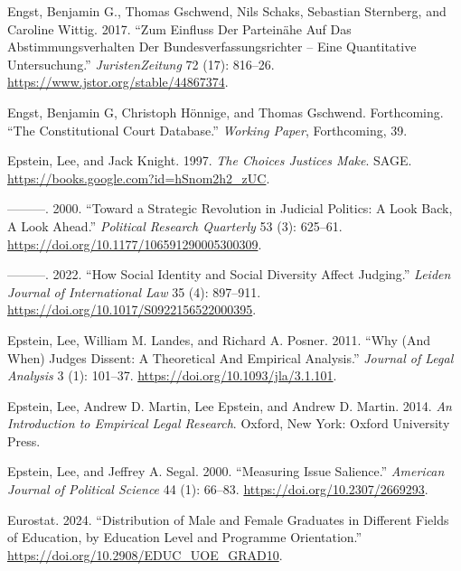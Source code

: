 \documentclass[
  11pt,
]{article}
\newlength{\cslhangindent}
\newenvironment{CSLReferences}[2] %
 {\begin{list}{}{%
  \setlength{\itemindent}{0pt}
  \setlength{\leftmargin}{0pt}
  \setlength{\parsep}{0pt}
  \ifodd #1
   \setlength{\leftmargin}{\cslhangindent}
   \setlength{\itemindent}{-1\cslhangindent}
  \fi
  \setlength{\itemsep}{#2\baselineskip}}}
 {\end{list}}
\begin{document}
\begin{CSLReferences}{1}{0}
Engst, Benjamin G., Thomas Gschwend, Nils Schaks, Sebastian Sternberg, and Caroline Wittig. 2017. {``Zum {Einfluss} Der {Parteinähe} Auf Das {Abstimmungsverhalten} Der {Bundesverfassungsrichter} -- Eine Quantitative {Untersuchung}.''} \emph{JuristenZeitung} 72 (17): 816--26. \url{https://www.jstor.org/stable/44867374}.

Engst, Benjamin G, Christoph Hönnige, and Thomas Gschwend. Forthcoming. {``The {Constitutional Court Database}.''} \emph{Working Paper}, Forthcoming, 39.

Epstein, Lee, and Jack Knight. 1997. \emph{The {Choices Justices Make}}. SAGE. \url{https://books.google.com?id=hSnom2h2_zUC}.

---------. 2000. {``Toward a {Strategic Revolution} in {Judicial Politics}: {A Look Back}, {A Look Ahead}.''} \emph{Political Research Quarterly} 53 (3): 625--61. \url{https://doi.org/10.1177/106591290005300309}.

---------. 2022. {``How Social Identity and Social Diversity Affect Judging.''} \emph{Leiden Journal of International Law} 35 (4): 897--911. \url{https://doi.org/10.1017/S0922156522000395}.

Epstein, Lee, William M. Landes, and Richard A. Posner. 2011. {``Why ({And When}) {Judges Dissent}: {A Theoretical And Empirical Analysis}.''} \emph{Journal of Legal Analysis} 3 (1): 101--37. \url{https://doi.org/10.1093/jla/3.1.101}.

Epstein, Lee, Andrew D. Martin, Lee Epstein, and Andrew D. Martin. 2014. \emph{An {Introduction} to {Empirical Legal Research}}. Oxford, New York: Oxford University Press.

Epstein, Lee, and Jeffrey A. Segal. 2000. {``Measuring {Issue Salience}.''} \emph{American Journal of Political Science} 44 (1): 66--83. \url{https://doi.org/10.2307/2669293}.

Eurostat. 2024. {``Distribution of Male and Female Graduates in Different Fields of Education, by Education Level and Programme Orientation.''} \url{https://doi.org/10.2908/EDUC_UOE_GRAD10}.


\end{CSLReferences}
\end{document}
